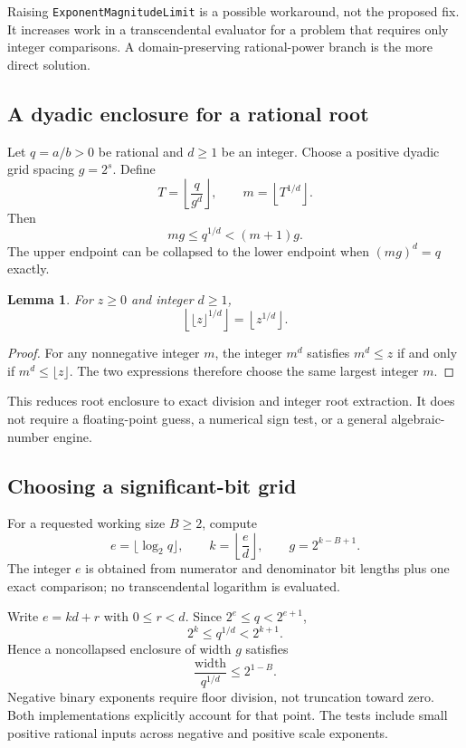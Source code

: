 \documentclass[11pt,a4paper]{article}
\newcommand{\code}[1]{\nolinkurl{#1}}
\newtheorem{lemma}{Lemma}
\begin{document}
Raising \code{ExponentMagnitudeLimit} is a possible workaround, not the proposed fix. It increases work in a transcendental evaluator for a problem that requires only integer comparisons. A domain-preserving rational-power branch is the more direct solution.

\subsection{A dyadic enclosure for a rational root}

Let $q=a/b>0$ be rational and $d\ge1$ be an integer. Choose a positive dyadic grid spacing $g=2^s$. Define
\[
T=\left\lfloor\frac{q}{g^d}\right\rfloor,
\qquad m=\left\lfloor T^{1/d}\right\rfloor.
\]
Then
\[
mg\le q^{1/d}<(m+1)g.
\]
The upper endpoint can be collapsed to the lower endpoint when $(mg)^d=q$ exactly.

\begin{lemma}
For $z\ge0$ and integer $d\ge1$,
\[
\left\lfloor\bigl\lfloor z\bigr\rfloor^{1/d}\right\rfloor
=\left\lfloor z^{1/d}\right\rfloor.
\]
\end{lemma}
\begin{proof}
For any nonnegative integer $m$, the integer $m^d$ satisfies $m^d\le z$ if and only if $m^d\le\lfloor z\rfloor$. The two expressions therefore choose the same largest integer $m$.
\end{proof}

This reduces root enclosure to exact division and integer root extraction. It does not require a floating-point guess, a numerical sign test, or a general algebraic-number engine.

\subsection{Choosing a significant-bit grid}

For a requested working size $B\ge2$, compute
\[
e=\lfloor\log_2q\rfloor,\qquad k=\left\lfloor\frac ed\right\rfloor,
\qquad g=2^{k-B+1}.
\]
The integer $e$ is obtained from numerator and denominator bit lengths plus one exact comparison; no transcendental logarithm is evaluated.

Write $e=kd+r$ with $0\le r<d$. Since $2^e\le q<2^{e+1}$,
\[
2^k\le q^{1/d}<2^{k+1}.
\]
Hence a noncollapsed enclosure of width $g$ satisfies
\[
\frac{\text{width}}{q^{1/d}}\le2^{1-B}.
\]
Negative binary exponents require floor division, not truncation toward zero. Both implementations explicitly account for that point. The tests include small positive rational inputs across negative and positive scale exponents.
\end{document}
